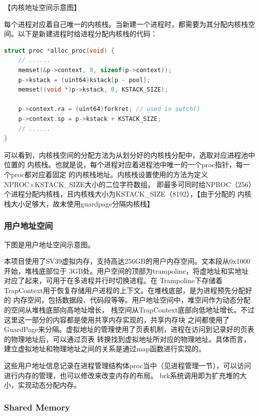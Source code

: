 \documentclass[UTF8,a4paper,10pt]{ctexart}
\begin{document}
【内核地址空间示意图】

每个进程对应着自己唯一的内核栈。当新建一个进程时，都需要为其分配内核栈空间。以下是新建进程时给进程分配内核栈的代码：

\begin{lstlisting}[title=分配内核栈空间,frame=trbl,language={C}]
struct proc *alloc_proc(void) {
    // ......
    memset(&p->context, 0, sizeof(p->context));
    p->kstack = (uint64)kstack[p - pool];
    memset((void *)p->kstack, 0, KSTACK_SIZE);

    p->context.ra = (uint64)forkret; // used in swtch()
    p->context.sp = p->kstack + KSTACK_SIZE;
    // ......
}
\end{lstlisting}

可以看到，内核栈空间的分配方法为从划分好的内核栈分配中，选取对应进程池中位置的
内核栈。也就是说，每个进程对应着进程池中唯一的一个proc指针，每一个proc都对应着固定
的内核栈地址。内核栈设置使用的方法为定义NPROC×KSTACK\_SIZE大小的二位字符数组，
即最多可同时给NPROC（256）个进程分配内核栈，且内核栈大小为KSTACK\_SIZE（8192），【由于分配的
内核栈大小足够大，故未使用guardpage分隔内核栈】

\subsubsection{用户地址空间}

下图是用户地址空间示意图。

本项目使用了SV39虚拟内存，支持高达256GB的用户内存空间。文本段从0x1000开始，堆栈底部位于
3GB处。用户空间的顶部为trampoline，将虚地址和实地址对应了起来，可用于在多进程并行时切换进程。在
Trampoline下存储着TrapContext用于恢复存储用户进程的上下文。在堆栈底部，是为进程预先分配好的
内存空间，包括数据段、代码段等等。用户地址空间中，堆空间作为动态分配的空间从堆栈底部向高地址增长，
栈空间从TrapContext底部向低地址增长。不过这里这一部分的内容都是使用共享内存实现的，共享内存块
之间都使用了GuardPage来分隔。虚拟地址的管理使用了页表机制，进程在访问到记录好的页表的物理地址后，可以通过页表
转换找到虚拟地址所对应的物理地址。具体而言，建立虚拟地址和物理地址之间的关系是通过map函数进行实现的。

这些用户地址信息记录在进程管理结构体proc当中（见进程管理一节），可以访问进行内存的管理，也可以修改来改变内存的布局。
brk系统调用即为扩充堆的大小，实现动态分配内存。


\subsubsection{Shared Memory}
\end{document}
